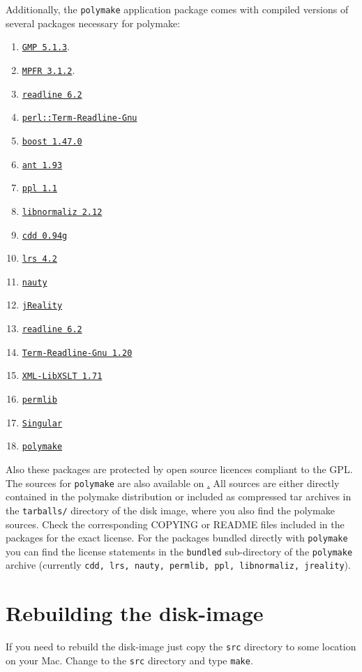 \documentclass[a4paper]{amsart}
\newcommand{\polymake}{\texttt{polymake}\xspace}
\begin{document}
Additionally, the \polymake application package comes with compiled
versions of several packages necessary for polymake: 
\begin{enumerate}
\item \href{http://gmplib.org/}{\texttt{GMP 5.1.3}}.
\item \href{http://mpfr.org/}{\texttt{MPFR 3.1.2}}.
\item \href{http://tiswww.case.edu/php/chet/readline/rltop.html}{\texttt{readline 6.2}}
\item \href{http://search.cpan.org/dist/Term-ReadLine-Gnu/}{\texttt{perl::Term-Readline-Gnu}}
\item \href{http://www.boost.org/}{\texttt{boost 1.47.0}}
\item \href{http://ant.apache.org/}{\texttt{ant 1.93}}
\item \href{http://bugseng.com/products/ppl/}{\texttt{ppl 1.1}}
\item \href{http://www.home.uni-osnabrueck.de/wbruns/normaliz/}{\texttt{libnormaliz 2.12}}
\item \href{http://www.inf.ethz.ch/personal/fukudak/cdd_home/}{\texttt{cdd 0.94g}}
\item \href{http://cgm.cs.mcgill.ca/~avis/C/lrs.html}{\texttt{lrs 4.2}}
\item \href{http://cs.anu.edu.au/~bdm/nauty/}{\texttt{nauty}}
\item \href{http://www3.math.tu-berlin.de/jreality/}{\texttt{jReality}}
\item \href{http://cnswww.cns.cwru.edu/php/chet/readline/rltop.html}{\texttt{readline 6.2}}
\item \href{http://search.cpan.org/~hayashi/Term-ReadLine-Gnu-1.20/Gnu.pm}{\texttt{Term-Readline-Gnu 1.20}}
\item \href{http://search.cpan.org/~shlomif/XML-LibXSLT-1.87/LibXSLT.pm}{\texttt{XML-LibXSLT 1.71}}
\item \href{http://www.math.uni-rostock.de/~rehn/software/permlib.html}{\texttt{permlib}}
\item \href{https://github.com/Singular/Sources}{\texttt{Singular}}
\item \href{https://github.com/polymake/polymake}{\texttt{polymake}}
\end{enumerate}
Also these packages are protected by open source licences compliant to
the GPL. The sources for \polymake are also available on \href{http://polymake.org/doku.php/download/start}. 
All sources are either directly contained in the 
polymake distribution or included as compressed tar archives in the
\texttt{tarballs/} directory of the disk image, where you also find the polymake sources. Check the
corresponding COPYING or README files included in the packages for the
exact license.  For the packages bundled directly with \polymake you
can find the license statements in the \texttt{bundled} sub-directory
of the \polymake archive (currently \texttt{cdd, lrs, nauty, permlib, ppl, libnormaliz, jreality}).

\section*{Rebuilding the disk-image}

If you need to rebuild the disk-image just copy the \texttt{src}
directory to some location on your Mac. Change to the \texttt{src}
directory and type \texttt{make}.
\end{document}
